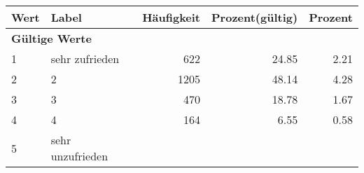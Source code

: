      \begin{longtable}{lXrrr}
     \toprule
     \textbf{Wert} & \textbf{Label} & \textbf{Häufigkeit} & \textbf{Prozent(gültig)} & \textbf{Prozent} \\
     \endhead
     \midrule
     \multicolumn{5}{l}{\textbf{Gültige Werte}}\\

     1 &
     \multicolumn{1}{X}{ sehr zufrieden   } &


       \num{622} &
       \num[round-mode=places,round-precision=2]{24.85} &
         \num[round-mode=places,round-precision=2]{2.21} \\

     2 &
     \multicolumn{1}{X}{ 2   } &


       \num{1205} &
       \num[round-mode=places,round-precision=2]{48.14} &
         \num[round-mode=places,round-precision=2]{4.28} \\

     3 &
     \multicolumn{1}{X}{ 3   } &


       \num{470} &
       \num[round-mode=places,round-precision=2]{18.78} &
         \num[round-mode=places,round-precision=2]{1.67} \\

     4 &
     \multicolumn{1}{X}{ 4   } &


       \num{164} &
       \num[round-mode=places,round-precision=2]{6.55} &
         \num[round-mode=places,round-precision=2]{0.58} \\

     5 &
     \multicolumn{1}{X}{ sehr unzufrieden   } &



\end{longtable}
